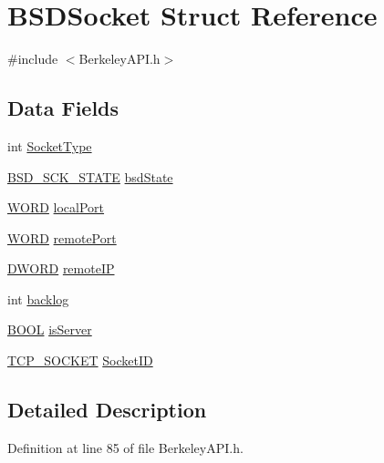 \hypertarget{struct_b_s_d_socket}{}\section{B\+S\+D\+Socket Struct Reference}
\label{struct_b_s_d_socket}


{\ttfamily \#include $<$Berkeley\+A\+P\+I.\+h$>$}

\subsection*{Data Fields}
\begin{DoxyCompactItemize}
\item 
int \hyperlink{struct_b_s_d_socket_a80dfcccad4190214f0ca2f4b6c351a84}{Socket\+Type}
\item 
\hyperlink{_berkeley_a_p_i_8h_a6afe3bd4d7a3f627c0ae03da2b955a47}{B\+S\+D\+\_\+\+S\+C\+K\+\_\+\+S\+T\+A\+T\+E} \hyperlink{struct_b_s_d_socket_aa76842716670b8888269696eba685c1e}{bsd\+State}
\item 
\hyperlink{_generic_type_defs_8h_a2b0e863dadf920709ec53d9088ee7c91}{W\+O\+R\+D} \hyperlink{struct_b_s_d_socket_af6861e9d9788b339f1aa2da497069de6}{local\+Port}
\item 
\hyperlink{_generic_type_defs_8h_a2b0e863dadf920709ec53d9088ee7c91}{W\+O\+R\+D} \hyperlink{struct_b_s_d_socket_a2ec385f33979be71fe355f5ea5f1f609}{remote\+Port}
\item 
\hyperlink{_generic_type_defs_8h_ad342ac907eb044443153a22f964bf0af}{D\+W\+O\+R\+D} \hyperlink{struct_b_s_d_socket_aa14bd86282eb60a34be94fe28c516f6d}{remote\+I\+P}
\item 
int \hyperlink{struct_b_s_d_socket_a9507e1c27beffe02ed97c7b076a42f24}{backlog}
\item 
\hyperlink{_generic_type_defs_8h_a54d65c7fa62e62c9754371e42f5111b9}{B\+O\+O\+L} \hyperlink{struct_b_s_d_socket_a9bf807f17580892a625b6ab963140f1e}{is\+Server}
\item 
\hyperlink{_t_c_p_8h_abe3757e564cff2f301e49564cbb5f878}{T\+C\+P\+\_\+\+S\+O\+C\+K\+E\+T} \hyperlink{struct_b_s_d_socket_a6302c1f4ef1d35ec801d349cfbaa21c9}{Socket\+I\+D}
\end{DoxyCompactItemize}


\subsection{Detailed Description}


Definition at line 85 of file Berkeley\+A\+P\+I.\+h.



